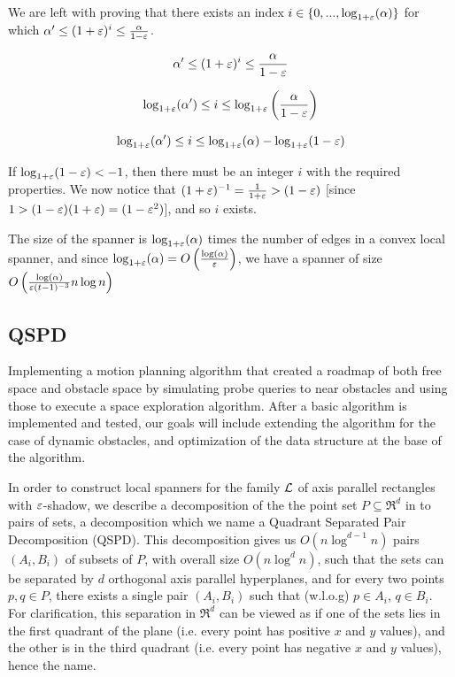 \documentclass[12pt]{article}%
\begin{document}
We are left with proving that there exists an index $i\in \{0,...,\log_{1+\varepsilon}(\alpha)\}$ for which $\alpha' \leq (1+\varepsilon)^i \leq \frac{\alpha}{1-\varepsilon}$.

$$\alpha' \leq (1+\varepsilon)^i \leq \frac{\alpha}{1-\varepsilon}$$

$$\log_{1+\varepsilon}(\alpha') \leq i \leq \log_{1+\varepsilon}\left(\frac{\alpha}{1-\varepsilon}\right)$$

$$\log_{1+\varepsilon}(\alpha') \leq i \leq \log_{1+\varepsilon}(\alpha) - \log_{1+\varepsilon}(1-\varepsilon)$$

If $\log_{1+\varepsilon}(1-\varepsilon)<-1$, then there must be an integer $i$ with the required properties. We now notice that $(1+\varepsilon)^{-1}=\frac{1}{1+\varepsilon}>(1-\varepsilon)$ [since $1>(1-\varepsilon)(1+\varepsilon)=(1-\varepsilon^2)$], and so $i$ exists.

The size of the spanner is $\log_{1+\varepsilon}(\alpha)$ times the number of edges in a convex local spanner, and since $\log_{1+\varepsilon}(\alpha)=O\left(\frac{\log(\alpha)}{\varepsilon}\right)$, we have a spanner of size $O\left(\frac{\log(\alpha)}{\varepsilon (t-1)^{-3}}n\log n\right)$

\subsection{QSPD}
Implementing a motion planning algorithm that created a roadmap of both free space and obstacle space by simulating probe queries to near obstacles and using those to execute a space exploration algorithm.
After a basic algorithm is implemented and tested, our goals will include extending the algorithm for the case of dynamic obstacles, and optimization of the data structure at the base of the algorithm.

In order to construct local spanners for the family $\mathcal{L}$ of axis parallel rectangles with $\varepsilon$-shadow, we describe a decomposition of the the point set $P\subseteq \Re^d$ in to pairs of sets, a decomposition which we name a Quadrant Separated Pair Decomposition (QSPD). This decomposition gives us $O(n\log^{d-1}n)$ pairs $(A_i,B_i)$ of subsets of $P$, with overall size $O(n\log^{d}n)$, such that the sets can be separated by $d$ orthogonal axis parallel hyperplanes, and for every two points $p,q\in P$, there exists a single pair $(A_i,B_i)$ such that (w.l.o.g) $p\in A_i$, $q\in B_i$. For clarification, this separation in $\Re^d$ can be viewed as if one of the sets lies in the first quadrant of the plane (i.e. every point has positive $x$ and $y$ values), and the other is in the third quadrant (i.e. every point has negative $x$ and $y$ values), hence the name.
\end{document}

